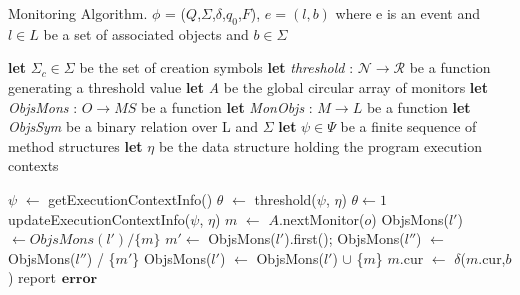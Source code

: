 \begin{algorithm}[t]
\caption[Algorithm]{Monitoring Algorithm. $\phi$ = 
($Q$,$\Sigma$,$\delta$,$q_{0}$,$F$), $e=(l,b)$ where e is an event and $l \in L$ 
be a set of associated objects and $b \in \Sigma$}          %
\label{alg1}                           %
\begin{algorithmic}[1]                  
   \STATE \textbf{let} $\Sigma_{c} \in \Sigma$ be the set of creation symbols
   \STATE \textbf{let} \textit{threshold} : $\mathcal{N} \to \mathcal{R}$ be a 
function generating a threshold value
   \STATE \textbf{let} \textit{A} be the global circular array of monitors
   \STATE \textbf{let} \textit{ObjsMons} : $O \to \textit{MS}$ be a function
   \STATE \textbf{let} \textit{MonObjs} : $M \to L$ be a function
   \STATE \textbf{let} \textit{ObjsSym} be a binary relation over L and $\Sigma$
   \STATE \textbf{let} $\psi \in \Psi$ be a finite sequence of method structures
   \STATE \textbf{let} $\eta$ be the data structure holding the program 
execution contexts
   
        \STATE $\psi$  $\leftarrow$ getExecutionContextInfo()
           \STATE $\theta$ $\leftarrow$ threshold($\psi$, $\eta$)
        \ELSE
        	   \STATE $\theta \leftarrow 1$
        \ENDIF
        \STATE updateExecutionContextInfo($\psi$, $\eta$)
            	\STATE $m$ $\leftarrow$ $A$.nextMonitor($o$)
		\STATE ObjsMons($l'$) $\leftarrow  ObjsMons(l') / \{m\}$
        		\ENDFOR
				 \STATE $m' \leftarrow$ ObjsMons($l'$).first();
					\STATE ObjsMons($l''$) $\leftarrow$  
ObjsMons($l''$) / \{$m'$\}
        				\ENDFOR
			\ENDIF
                		 \STATE ObjsMons($l'$) $\leftarrow$  
ObjsMons($l'$) $\cup$ \{$m$\}
        		\ENDFOR
        \ENDIF
 \ENDIF
     \STATE $m$.cur $\leftarrow$ $\delta$($m$.cur,$b$)
        \STATE report$\hspace{5pt}\textbf{error}$
     \ENDIF
 \ENDFOR
 
\end{algorithmic}

\end{algorithm}
\label{algo:monitoring}



